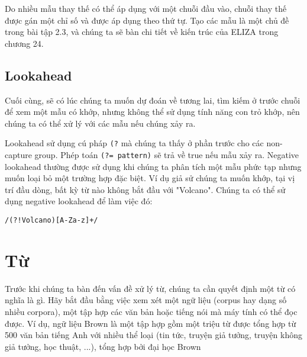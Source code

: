 Do nhiều mẫu thay thế có thể áp dụng với một chuỗi đầu vào, chuỗi thay thế được gán một chỉ số và được áp dụng theo thứ tự. Tạo các mẫu là một chủ đề trong bài tập 2.3, và chúng ta sẽ bàn chi tiết về kiến trúc của ELIZA trong chương 24.

\vspace{20em}

\subsection{Lookahead}

Cuối cùng, sẽ có lúc chúng ta muốn dự đoán về tương lai, tìm kiếm ở trước chuỗi để xem một mẫu có khớp, nhưng không thể sử dụng tính năng con trỏ khớp, nên chúng ta có thể xử lý với các mẫu nếu chúng xảy ra.

Lookahead sử dụng cú pháp \verb|(?| mà chúng ta thấy ở phần trước cho các non-capture group. Phép toán \verb|(?= pattern)| sẽ trả về true nếu mẫu xảy ra. Negative lookahead thường được sử dụng khi chúng ta phân tích một mẫu phức tạp nhưng muốn loại bỏ một trường hợp đặc biệt. Ví dụ giả sử chúng ta muốn khớp, tại vị trí đầu dòng, bất kỳ từ nào không bắt đầu với "Volcano". Chúng ta có thể sử dụng negative lookahead để làm việc đó:

\vspace{0.6em}

\noindent \texttt{/(?!Volcano)[A-Za-z]+/}

\vspace{0.6em}

\section{Từ}

Trước khi chúng ta bàn đến vấn đề xử lý từ, chúng ta cần quyết định một từ có nghĩa là gì. Hãy bắt đầu bằng việc xem xét một ngữ liệu (corpus hay dạng số nhiều corpora), một tập hợp các văn bản hoặc tiếng nói mà máy tính có thể đọc được. Ví dụ, ngữ liệu Brown là một tập hợp gồm một triệu từ được tổng hợp từ 500 văn bản tiếng Anh với nhiều thể loại (tin tức, truyện giả tưởng, truyện không giả tưởng, học thuật, ...), tổng hợp bởi đại học Brown